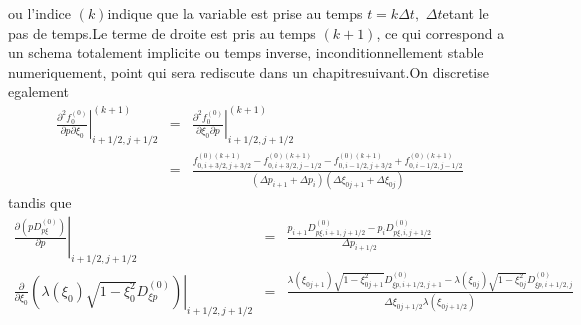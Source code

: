  ou l'indice $(k)$indique que la variable est prise au temps $t=k\Delta t,$
$\Delta t$etant le pas de temps.Le terme de droite est pris au temps
$(k+1)$, ce qui correspond a un schema totalement implicite ou temps
inverse, inconditionnellement stable numeriquement, point qui sera
rediscute dans un chapitresuivant.On discretise egalement \begin{eqnarray*}
\left.\frac{\partial^{2}f_{0}^{\left(0\right)}}{\partial p\partial\xi_{0}}\right|_{i+1/2,j+1/2}^{(k+1)} & = & \left.\frac{\partial^{2}f_{0}^{\left(0\right)}}{\partial\xi_{0}\partial p}\right|_{i+1/2,j+1/2}^{(k+1)}\\
 & = & \frac{f_{0,i+3/2,j+3/2}^{\left(0\right)(k+1)}-f_{0,i+3/2,j-1/2}^{\left(0\right)(k+1)}-f_{0,i-1/2,j+3/2}^{\left(0\right)(k+1)}+f_{0,i-1/2,j-1/2}^{\left(0\right)(k+1)}}{\left(\Delta p_{i+1}+\Delta p_{i}\right)\left(\Delta\xi_{0j+1}+\Delta\xi_{0j}\right)}\end{eqnarray*}
 tandis que \begin{eqnarray*}
\left.\frac{\partial\left(pD_{p\xi}^{\left(0\right)}\right)}{\partial p}\right|_{i+1/2,j+1/2} & = & \frac{p_{i+1}D_{p\xi,i+1,j+1/2}^{\left(0\right)}-p_{i}D_{p\xi,i,j+1/2}^{\left(0\right)}}{\Delta p_{i+1/2}}\\
\left.\frac{\partial}{\partial\xi_{0}}\left(\lambda\left(\xi_{0}\right)\sqrt{1-\xi_{0}^{2}}D_{\xi p}^{\left(0\right)}\right)\right|_{i+1/2,j+1/2} & = & \frac{\lambda\left(\xi_{0j+1}\right)\sqrt{1-\xi_{0j+1}^{2}}D_{\xi p,i+1/2,j+1}^{\left(0\right)}-\lambda\left(\xi_{0j}\right)\sqrt{1-\xi_{0j}^{2}}D_{\xi p,i+1/2,j}^{\left(0\right)}}{\Delta\xi_{0j+1/2}\lambda\left(\xi_{0j+1/2}\right)}\end{eqnarray*}


